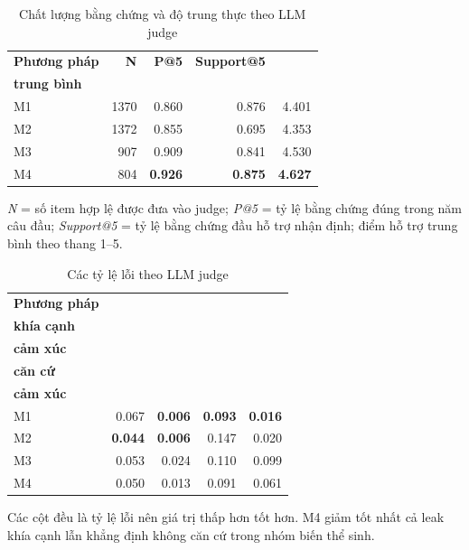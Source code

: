 \documentclass[12pt,a4paper]{report}
\begin{document}
\begin{table}[tbp]
\centering
\caption{Chất lượng bằng chứng và độ trung thực theo LLM judge}
\label{tab:evidence-faithfulness}
\begin{threeparttable}
\begin{tabular}{l r r r r}
\toprule
\textbf{Phương pháp} & \textbf{N} & \textbf{P@5} & \textbf{Support@5} & \makecell{\textbf{Điểm hỗ trợ}\\\textbf{trung bình}} \\
\midrule
M1 & 1370 & \num{0.860} & \num{0.876} & \num{4.401} \\
M2 & 1372 & \num{0.855} & \num{0.695} & \num{4.353} \\
M3 &  907 & \num{0.909} & \num{0.841} & \num{4.530} \\
M4 &  804 & \textbf{\num{0.926}} & \textbf{\num{0.875}} & \textbf{\num{4.627}} \\
\bottomrule
\end{tabular}
\begin{tablenotes}
\footnotesize
\item \textit{N} = số item hợp lệ được đưa vào judge; \textit{P@5} = tỷ lệ bằng chứng đúng trong năm câu đầu; \textit{Support@5} = tỷ lệ bằng chứng đầu hỗ trợ nhận định; điểm hỗ trợ trung bình theo thang 1--5.
\end{tablenotes}
\end{threeparttable}
\end{table}

\begin{table}[tbp]
\centering
\caption{Các tỷ lệ lỗi theo LLM judge}
\label{tab:judge-errors}
\begin{threeparttable}
\begin{tabular}{l r r r r}
\toprule
\textbf{Phương pháp} & \makecell{\textbf{Leak}\\\textbf{khía cạnh}} & \makecell{\textbf{Leak}\\\textbf{cảm xúc}} & \makecell{\textbf{Không}\\\textbf{căn cứ}} & \makecell{\textbf{Lật}\\\textbf{cảm xúc}} \\
\midrule
M1 & \num{0.067} & \textbf{\num{0.006}} & \textbf{\num{0.093}} & \textbf{\num{0.016}} \\
M2 & \textbf{\num{0.044}} & \textbf{\num{0.006}} & \num{0.147} & \num{0.020} \\
M3 & \num{0.053} & \num{0.024} & \num{0.110} & \num{0.099} \\
M4 & \num{0.050} & \num{0.013} & \num{0.091} & \num{0.061} \\
\bottomrule
\end{tabular}
\begin{tablenotes}
\footnotesize
\item Các cột đều là tỷ lệ lỗi nên giá trị thấp hơn tốt hơn. M4 giảm tốt nhất cả leak khía cạnh lẫn khẳng định không căn cứ trong nhóm biến thể sinh.
\end{tablenotes}
\end{threeparttable}
\end{table}
\end{document}
